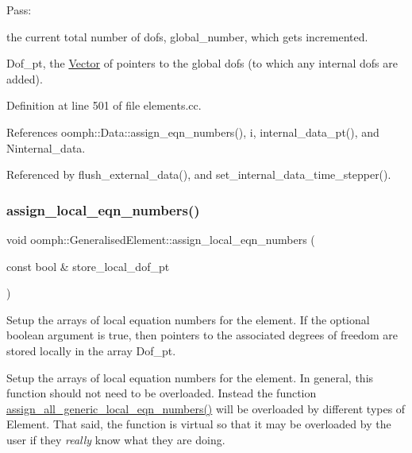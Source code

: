 Pass\+:
\begin{DoxyItemize}
\item the current total number of dofs, global\+\_\+number, which gets incremented.
\item Dof\+\_\+pt, the \hyperlink{classoomph_1_1Vector}{Vector} of pointers to the global dofs (to which any internal dofs are added).
\end{DoxyItemize}

Definition at line 501 of file elements.\+cc.



References oomph\+::\+Data\+::assign\+\_\+eqn\+\_\+numbers(), i, internal\+\_\+data\+\_\+pt(), and Ninternal\+\_\+data.



Referenced by flush\+\_\+external\+\_\+data(), and set\+\_\+internal\+\_\+data\+\_\+time\+\_\+stepper().

\mbox{\label{classoomph_1_1GeneralisedElement_ac5aa22a9fb43a762e0bec65d210cff19}} 
\subsubsection{\texorpdfstring{assign\+\_\+local\+\_\+eqn\+\_\+numbers()}{assign\_local\_eqn\_numbers()}}
{\footnotesize\ttfamily void oomph\+::\+Generalised\+Element\+::assign\+\_\+local\+\_\+eqn\+\_\+numbers (\begin{DoxyParamCaption}\item[{const bool \&}]{store\+\_\+local\+\_\+dof\+\_\+pt }\end{DoxyParamCaption})\hspace{0.3cm}{\ttfamily [virtual]}}



Setup the arrays of local equation numbers for the element. If the optional boolean argument is true, then pointers to the associated degrees of freedom are stored locally in the array Dof\+\_\+pt. 

Setup the arrays of local equation numbers for the element. In general, this function should not need to be overloaded. Instead the function \hyperlink{classoomph_1_1GeneralisedElement_a35dfba78813087c1070c9fd1a69824e5}{assign\+\_\+all\+\_\+generic\+\_\+local\+\_\+eqn\+\_\+numbers()} will be overloaded by different types of Element. That said, the function is virtual so that it may be overloaded by the user if they {\itshape really} know what they are doing. 

